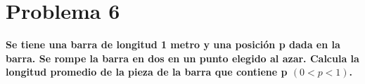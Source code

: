 \section*{Problema 6}

\textbf{Se tiene una barra de longitud 1 metro y una posición p dada en la barra. Se rompe la barra en dos en un punto elegido al azar. Calcula la longitud promedio de la pieza de la barra que contiene p $(0 < p < 1)$.}